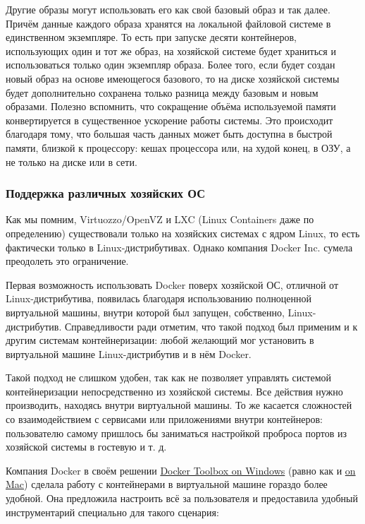 \documentclass[14pt, a4paper]{article}
\begin{document}
Другие образы могут использовать его как свой базовый образ и так далее. Причём данные каждого
образа хранятся на локальной файловой системе в единственном экземпляре. То есть при запуске
десяти контейнеров, использующих один и тот же образ, на хозяйской системе будет храниться и
использоваться только один экземпляр образа. Более того, если будет создан новый образ на основе
имеющегося базового, то на диске хозяйской системы будет дополнительно сохранена только разница
между базовым и новым образами. Полезно вспомнить, что сокращение объёма используемой памяти
конвертируется в существенное ускорение работы системы. Это происходит благодаря тому, что
большая часть данных может быть доступна в быстрой памяти, близкой к процессору: кешах
процессора или, на худой конец, в ОЗУ, а не только на диске или в сети.

\subsubsection*{Поддержка различных хозяйских ОС}

Как мы помним, Virtuozzo/OpenVZ и LXC (Linux Containers даже по определению) существовали только
на хозяйских системах с ядром Linux, то есть фактически только в Linux-дистрибутивах. Однако
компания Docker Inc. сумела преодолеть это ограничение.

Первая возможность использовать Docker поверх хозяйской ОС, отличной от Linux-дистрибутива,
появилась благодаря использованию полноценной виртуальной машины, внутри которой был
запущен, собственно, Linux-дистрибутив. Справедливости ради отметим, что такой подход был
применим и к другим системам контейнеризации: любой желающий мог установить в виртуальной
машине Linux-дистрибутив и в нём Docker.

Такой подход не слишком удобен, так как не позволяет управлять системой контейнеризации
непосредственно из хозяйской системы. Все действия нужно производить, находясь внутри
виртуальной машины. То же касается сложностей со взаимодействием с сервисами или
приложениями внутри контейнеров: пользователю самому пришлось бы заниматься настройкой
проброса портов из хозяйской системы в гостевую и т. д.

Компания Docker в своём решении \href{https://docs.docker.com/toolbox/toolbox_install_windows/}{Docker Toolbox on Windows} (равно как и \href{https://docs.docker.com/toolbox/toolbox_install_mac/}{on Mac}) сделала работу с
контейнерами в виртуальной машине гораздо более удобной. Она предложила настроить всё за
пользователя и предоставила удобный инструментарий специально для такого сценария:
\end{document}
